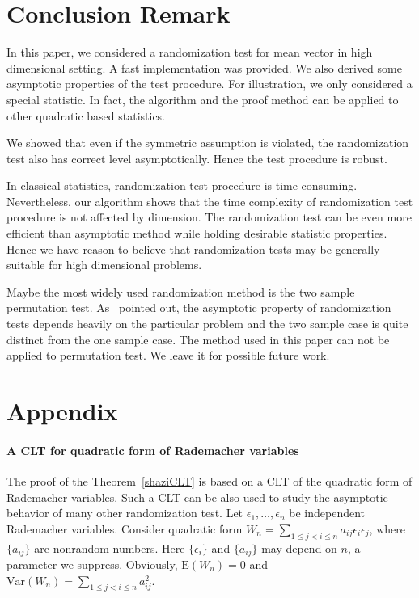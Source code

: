 \documentclass[review]{elsarticle}
\theoremstyle{plain}
\theoremstyle{definition}
\theoremstyle{remark}
\begin{document}
\section{Conclusion Remark}
In this paper, we considered a randomization test for mean vector in high dimensional setting.
A fast implementation was provided.
We also derived some asymptotic properties of the test procedure.
For illustration, we only considered a special statistic. In fact, the algorithm and the proof method can be applied to other quadratic based statistics.

We showed that even if the symmetric assumption is violated, the randomization test also has correct level asymptotically.
Hence the test procedure is robust.

In classical statistics, randomization test procedure is time consuming.
Nevertheless, our algorithm shows that the time complexity of randomization test procedure is not affected by dimension. 
The randomization test can be even more efficient than asymptotic method while holding desirable statistic properties.
Hence we have reason to believe that randomization tests may be generally suitable for high dimensional problems.


Maybe the most widely used randomization method is the two sample permutation test.
As~\cite{Romano1990On} pointed out, the asymptotic property of randomization tests depends heavily on the particular problem and the two sample case is quite distinct from the one sample case.
The method used in this paper can not be applied to permutation test.
We leave it for possible future work.


\section{Appendix}
\paragraph{A CLT for quadratic form of Rademacher variables}
The proof of the Theorem~\ref{shaziCLT} is based on a CLT of the quadratic form of Rademacher variables. 
Such a CLT can be also used to study the asymptotic behavior of many other randomization test.
 Let $\epsilon_1,\ldots,\epsilon_n$ be independent Rademacher  variables. 
 Consider quadratic form $W_n=\sum_{1\leq j<i\leq n} a_{ij}\epsilon_i \epsilon_j$, where $\{a_{ij}\}$ are nonrandom numbers. Here $\{\epsilon_i\}$ and $\{a_{ij}\}$ may depend on $n$, a parameter we suppress.
 Obviously, $\mathrm{E}(W_n)=0$ and $\mathrm{Var}(W_n)=\sum_{1\leq j<i\leq n} a_{ij}^2$.
\end{document}
